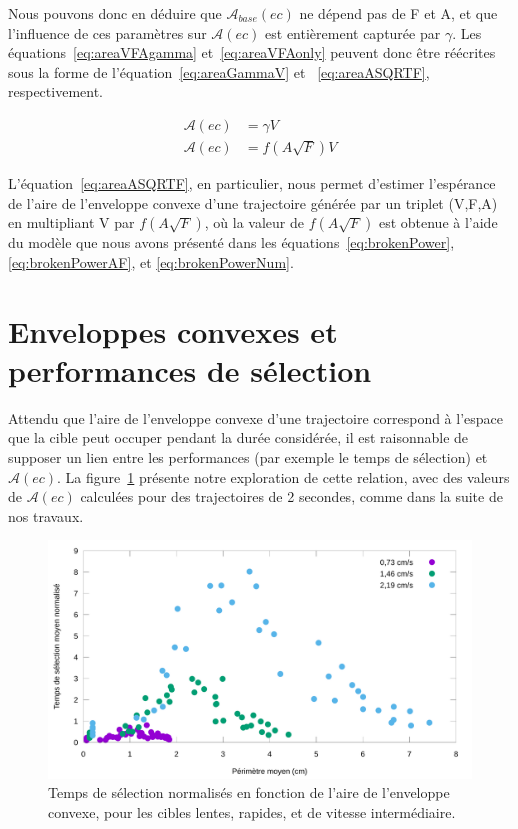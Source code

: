 	Nous pouvons donc en déduire que $\mathcal{A}_{base}(ec)$ ne dépend pas de F et A, et que l'influence de ces paramètres sur $\mathcal{A}(ec)$ est entièrement capturée par $\gamma$. Les équations~\ref{eq:areaVFAgamma} et~\ref{eq:areaVFAonly} peuvent donc être réécrites sous la forme de l'équation~\ref{eq:areaGammaV} et ~\ref{eq:areaASQRTF}, respectivement.
	
	\begin{align}
		\label{eq:areaGammaV}
		\mathcal{A}(ec) &= \gamma{}V \\
		\label{eq:areaASQRTF}
		\mathcal{A}(ec) &= f\left(A\sqrt{F}\right)V
	\end{align}
	
	L'équation~\ref{eq:areaASQRTF}, en particulier, nous permet d'estimer l'espérance de l'aire de l'enveloppe convexe d'une trajectoire générée par un triplet (V,F,A) en multipliant V par $f\left(A\sqrt{F}\right)$, où la valeur de $f\left(A\sqrt{F}\right)$ est obtenue à l'aide du modèle que nous avons présenté dans les équations~\ref{eq:brokenPower}, \ref{eq:brokenPowerAF}, et \ref{eq:brokenPowerNum}.
	
\section{Enveloppes convexes et performances de sélection}
	Attendu que l'aire de l'enveloppe convexe d'une trajectoire correspond à l'espace que la cible peut occuper pendant la durée considérée, il est raisonnable de supposer un lien entre les performances (par exemple le temps de sélection) et $\mathcal{A}(ec)$. La figure~\ref{fig:perfVareaRaw} présente notre exploration de cette relation, avec des valeurs de $\mathcal{A}(ec)$ calculées pour des trajectoires de 2 secondes, comme dans la suite de nos travaux.

	\begin{figure}[!htb]
		\centering
		\includegraphics[width=\textwidth]{figures/ch4/perfVareaRaw}
		\caption[Temps de sélection en fonction de l'aire de l'enveloppe convexe]{Temps de sélection normalisés en fonction de l'aire de l'enveloppe convexe, pour les cibles lentes, rapides, et de vitesse intermédiaire.}
		\label{fig:perfVareaRaw}
	\end{figure}

